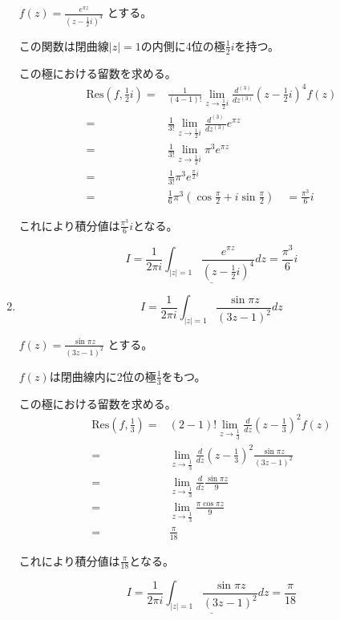 \documentclass[10pt,b5paper]{ltjsarticle}
\begin{document}
\begin{enumerate}
      $f(z) = \frac{e^{\pi z}}{(z-\frac{1}{2}i)^4}$
      とする。

      この関数は閉曲線$\lvert z \rvert =1$の内側に4位の極$\frac{1}{2}i$を持つ。

      この極における留数を求める。
      \begin{align}
       \mathrm{Res}(f,\frac{1}{2}i)
       =& \frac{1}{(4-1)!} \lim_{z\rightarrow \frac{1}{2}i}
               \frac{d^{(3)}}{dz^{(3)}} (z-\frac{1}{2}i)^4f(z)\\
           =& \frac{1}{3!} \lim_{z\rightarrow \frac{1}{2}i}\frac{d^{(3)}}{dz^{(3)}}e^{\pi z}\\
           =& \frac{1}{3!} \lim_{z\rightarrow \frac{1}{2}i}\pi^3e^{\pi z}\\
           =& \frac{1}{3!} \pi^3e^{\frac{\pi}{2}i}\\
           =& \frac{1}{6} \pi^3(\cos\frac{\pi}{2}+i\sin\frac{\pi}{2}) \quad =\frac{\pi^3}{6}i
      \end{align}

      これにより積分値は$\frac{\pi^3}{6}i$となる。

      \begin{equation}
       \underline{
        I = \frac{1}{2\pi i}\int_{\lvert z \rvert = 1}
        \frac{e^{\pi z}}{(z-\frac{1}{2}i)^4}dz
        = \frac{\pi^3}{6}i
        }
      \end{equation}
 \hrulefill
 \item
      \begin{equation}
       I = \frac{1}{2\pi i}\int_{\lvert z \rvert = 1}\frac{\sin\pi z}{(3z-1)^2}dz
      \end{equation}

      $f(z) = \frac{\sin\pi z}{(3z-1)^2}$
      とする。

      $f(z)$は閉曲線内に2位の極$\frac{1}{3}$をもつ。

      この極における留数を求める。
      \begin{align}
       \mathrm{Res}(f,\frac{1}{3})
       =& (2-1)! \lim_{z\rightarrow \frac{1}{3}} \frac{d}{dz} (z-\frac{1}{3})^2f(z)\\
           =& \lim_{z\rightarrow \frac{1}{3}}
               \frac{d}{dz} (z-\frac{1}{3})^2 \frac{\sin\pi z}{(3z-1)^2}\\
           =& \lim_{z\rightarrow \frac{1}{3}}\frac{d}{dz} \frac{\sin\pi z}{9}\\
           =& \lim_{z\rightarrow \frac{1}{3}} \frac{\pi \cos\pi z}{9}\\
           =& \frac{\pi}{18}
      \end{align}

      これにより積分値は$\frac{\pi}{18}$となる。

      \begin{equation}
       \underline{
       I = \frac{1}{2\pi i}\int_{\lvert z \rvert = 1}\frac{\sin\pi z}{(3z-1)^2}dz
       = \frac{\pi}{18}
       }
      \end{equation}

\end{enumerate}
\end{document}
